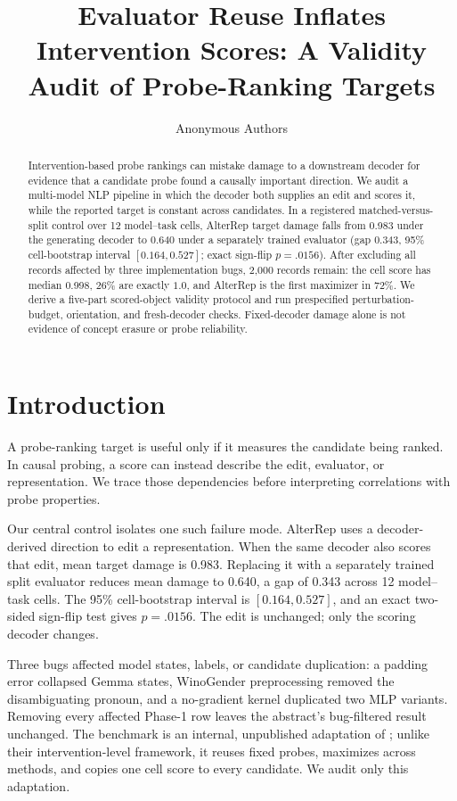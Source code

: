 \documentclass{article}
\title{Evaluator Reuse Inflates Intervention Scores: A Validity Audit of Probe-Ranking Targets}
\author{Anonymous Authors}
\newcommand{\SplitCells}{12}
\newcommand{\SplitMatched}{0.983}
\newcommand{\SplitIndependent}{0.640}
\newcommand{\SplitGap}{0.343}
\newcommand{\SplitCI}{$[0.164,0.527]$}
\newcommand{\SplitP}{.0156}
\newcommand{\BugFilteredN}{2{,}000}
\newcommand{\BugFilteredMedian}{0.998}
\newcommand{\BugFilteredCeiling}{26\%}
\newcommand{\BugFilteredAlterRep}{72\%}
\begin{document}
\maketitle

\begin{abstract}
Intervention-based probe rankings can mistake damage to a downstream decoder for evidence that a candidate probe found a causally important direction. We audit a multi-model NLP pipeline in which the decoder both supplies an edit and scores it, while the reported target is constant across candidates. In a registered matched-versus-split control over \SplitCells{} model--task cells, AlterRep target damage falls from \SplitMatched{} under the generating decoder to \SplitIndependent{} under a separately trained evaluator (gap \SplitGap{}, 95\% cell-bootstrap interval \SplitCI{}; exact sign-flip $p=\SplitP$). After excluding all records affected by three implementation bugs, \BugFilteredN{} records remain: the cell score has median \BugFilteredMedian{}, \BugFilteredCeiling{} are exactly $1.0$, and AlterRep is the first maximizer in \BugFilteredAlterRep{}. We derive a five-part scored-object validity protocol and run prespecified perturbation-budget, orientation, and fresh-decoder checks. Fixed-decoder damage alone is not evidence of concept erasure or probe reliability.
\end{abstract}

\section{Introduction}

A probe-ranking target is useful only if it measures the candidate being ranked. In causal probing, a score can instead describe the edit, evaluator, or representation. We trace those dependencies before interpreting correlations with probe properties.

Our central control isolates one such failure mode. AlterRep uses a decoder-derived direction to edit a representation. When the same decoder also scores that edit, mean target damage is \SplitMatched{}. Replacing it with a separately trained split evaluator reduces mean damage to \SplitIndependent{}, a gap of \SplitGap{} across \SplitCells{} model--task cells. The 95\% cell-bootstrap interval is \SplitCI{}, and an exact two-sided sign-flip test gives $p=\SplitP$. The edit is unchanged; only the scoring decoder changes.

Three bugs affected model states, labels, or candidate duplication: a padding error collapsed Gemma states, WinoGender preprocessing removed the disambiguating pronoun, and a no-gradient kernel duplicated two MLP variants. Removing every affected Phase-1 row leaves the abstract's bug-filtered result unchanged. The benchmark is an internal, unpublished adaptation of \citet{canby2025reliable}; unlike their intervention-level framework, it reuses fixed probes, maximizes across methods, and copies one cell score to every candidate. We audit only this adaptation.
\end{document}
